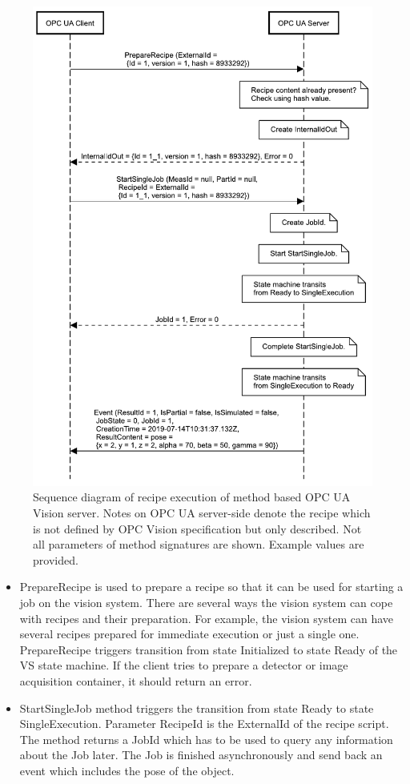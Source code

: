 \begin{figure}
    \centering
    \includegraphics[height=0.9\textheight]{img/OPCUAVisionPrepareRecipe.pdf}
    \caption[Sequence diagram of recipe execution]{Sequence diagram of recipe execution of method based OPC UA Vision server. Notes on OPC UA server-side denote the recipe which is not defined by OPC Vision specification but only described. Not all parameters of method signatures are shown. Example values are provided.}
    \label{fig:runtimeviewexec}
\end{figure}
    \begin{itemize}
    	\item PrepareRecipe is used to prepare a recipe so that it can be used for starting a job on the vision system. There are several ways the vision system can cope with recipes and their preparation. For example, the vision system can have several recipes prepared for immediate execution or just a single one. PrepareRecipe triggers transition from state Initialized to state Ready of the VS state machine. If the client tries to prepare a detector or image acquisition container, it should return an error.
    	\item StartSingleJob method triggers the transition from state Ready to state SingleExecution. Parameter RecipeId is the ExternalId of the recipe script. The method returns a JobId which has to be used to query any information about the Job later. The Job is finished asynchronously and send back an event which includes the pose of the object.
    \end{itemize}

